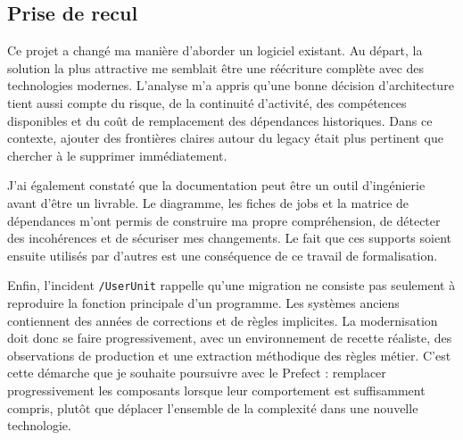 \subsection{Prise de recul}

Ce projet a changé ma manière d'aborder un logiciel existant. Au départ, la solution la plus attractive me semblait être une réécriture complète avec des technologies modernes. L'analyse m'a appris qu'une bonne décision d'architecture tient aussi compte du risque, de la continuité d'activité, des compétences disponibles et du coût de remplacement des dépendances historiques. Dans ce contexte, ajouter des frontières claires autour du legacy était plus pertinent que chercher à le supprimer immédiatement.

J'ai également constaté que la documentation peut être un outil d'ingénierie avant d'être un livrable. Le diagramme, les fiches de jobs et la matrice de dépendances m'ont permis de construire ma propre compréhension, de détecter des incohérences et de sécuriser mes changements. Le fait que ces supports soient ensuite utilisés par d'autres est une conséquence de ce travail de formalisation.

Enfin, l'incident \texttt{/UserUnit} rappelle qu'une migration ne consiste pas seulement à reproduire la fonction principale d'un programme. Les systèmes anciens contiennent des années de corrections et de règles implicites. La modernisation doit donc se faire progressivement, avec un environnement de recette réaliste, des observations de production et une extraction méthodique des règles métier. C'est cette démarche que je souhaite poursuivre avec le  Prefect : remplacer progressivement les composants lorsque leur comportement est suffisamment compris, plutôt que déplacer l'ensemble de la complexité dans une nouvelle technologie.
